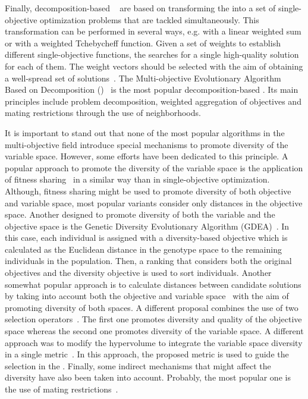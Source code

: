 Finally, decomposition-based \MOEAS{}~\cite{Joel:MOEAD_AMS} are based on transforming the \MOP{} into a set of 
single-objective optimization problems that are tackled simultaneously.
%
This transformation can be performed in several ways, e.g. with a linear weighted sum or with a weighted Tchebycheff function. 
%
Given a set of weights to establish different single-objective functions, the \MOEA{} searches for a single 
high-quality solution for each of them. 
%
The weight vectors should be selected with the aim of obtaining a well-spread set of solutions~\cite{Joel:Kalyanmoy}.
%
The Multi-objective Evolutionary Algorithm Based on Decomposition (\MOEAD{})~\cite{Joel:MOEAD} is the most popular 
decomposition-based \MOEA{}. 
%
Its main principles include problem decomposition, weighted aggregation of objectives and mating restrictions 
through the use of neighborhoods. 
 
It is important to stand out that none of the most popular algorithms in the multi-objective field introduce special 
mechanisms to promote diversity of the variable space.
%
However, some efforts have been dedicated to this principle.
%
A popular approach to promote the diversity of the variable space is the application of fitness sharing~\cite{Joel:NPGA} 
in a similar way than in single-objective optimization.
%
Although, fitness sharing might be used to promote diversity of both objective and variable space, most
popular variants consider only distances in the objective space.
%
Another \MOEA{} designed to promote diversity of both the variable and the objective space is the Genetic
Diversity Evolutionary Algorithm (GDEA)~\cite{toffolo2003genetic}.
%
In this case, each individual is assigned with a diversity-based objective which is calculated as the
Euclidean distance in the genotype space to the remaining individuals in the population.
%
Then, a ranking that considers both the original objectives and the diversity objective is used
to sort individuals.
%
Another somewhat popular approach is to calculate distances between candidate solutions by taking
into account both the objective and variable space~\cite{deb2005omni,shir2009enhancing} with the aim
of promoting diversity of both spaces.
%
A different proposal combines the use of two selection operators~\cite{chan2005evolutionary}.
%
The first one promotes diversity and quality of the objective space whereas the second one promotes diversity of the variable space.
%
A different approach was to modify the hypervolume to integrate the variable space diversity 
in a single metric~\cite{ulrich2010integrating}.
%
In this approach, the proposed metric is used to guide the selection in the \MOEA{}.
%
Finally, some indirect mechanisms that might affect the diversity have also been taken into account.
%
Probably, the most popular one is the use of mating restrictions~\cite{Joel:STUDY_MATTING_RESTRICTION,Joel:MOEAD_AMS}.

